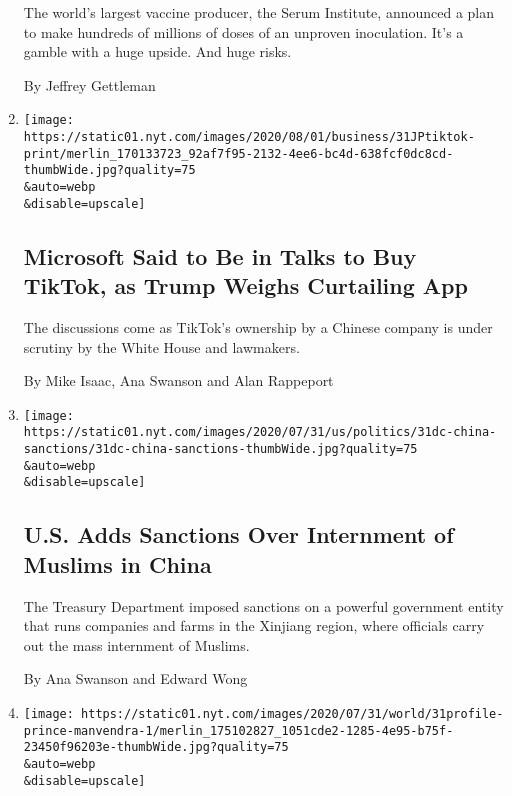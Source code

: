 \begin{enumerate}
  The world's largest vaccine producer, the Serum Institute, announced a
  plan to make hundreds of millions of doses of an unproven inoculation.
  It's a gamble with a huge upside. And huge risks.

  By Jeffrey Gettleman
\item
  \href{/2020/07/31/technology/tiktok-microsoft.html}{}

  \texttt{[image: https://static01.nyt.com/images/2020/08/01/business/31JPtiktok-print/merlin\_170133723\_92af7f95-2132-4ee6-bc4d-638fcf0dc8cd-thumbWide.jpg?quality=75\\\&auto=webp\\\&disable=upscale]}

  \hypertarget{microsoft-said-to-be-in-talks-to-buy-tiktok-as-trump-weighs-curtailing-app}{%
  \subsection{Microsoft Said to Be in Talks to Buy TikTok, as Trump
  Weighs Curtailing
  App}\label{microsoft-said-to-be-in-talks-to-buy-tiktok-as-trump-weighs-curtailing-app}}

  The discussions come as TikTok's ownership by a Chinese company is
  under scrutiny by the White House and lawmakers.

  By Mike Isaac, Ana Swanson and Alan Rappeport
\item
  \href{/2020/07/31/us/politics/sanctions-china-xinjiang-uighurs.html}{}

  \texttt{[image: https://static01.nyt.com/images/2020/07/31/us/politics/31dc-china-sanctions/31dc-china-sanctions-thumbWide.jpg?quality=75\\\&auto=webp\\\&disable=upscale]}

  \hypertarget{us-adds-sanctions-over-internment-of-muslims-in-china}{%
  \subsection{U.S. Adds Sanctions Over Internment of Muslims in
  China}\label{us-adds-sanctions-over-internment-of-muslims-in-china}}

  The Treasury Department imposed sanctions on a powerful government
  entity that runs companies and farms in the Xinjiang region, where
  officials carry out the mass internment of Muslims.

  By Ana Swanson and Edward Wong
\item
  \href{/2020/07/31/world/asia/india-prince-manvendra-gay-rights.html}{}

  \texttt{[image: https://static01.nyt.com/images/2020/07/31/world/31profile-prince-manvendra-1/merlin\_175102827\_1051cde2-1285-4e95-b75f-23450f96203e-thumbWide.jpg?quality=75\\\&auto=webp\\\&disable=upscale]}


\end{enumerate}
